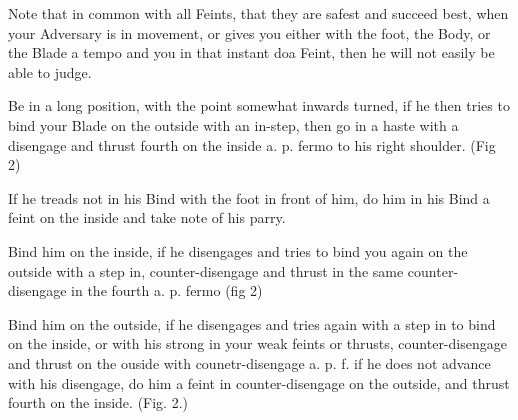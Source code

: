\newpage


\newpage

\exercise{}
Note that in common with all Feints, that they are safest and succeed
best, when your Adversary is in movement, or gives you either with the
foot, the Body, or the Blade a tempo and you in that instant doa
Feint, then he will not easily be able to judge.

Be in a long position, with the point somewhat inwards turned, if he
then tries to bind your Blade on the outside with an in-step, then go
in a haste with a disengage and thrust fourth on the inside
a. p. fermo to his right shoulder. (Fig 2)

\exercise{}
If he treads not in his Bind with the foot in front of him, do him in
his Bind a feint on the inside and take note of his parry.

\exercise{}
Bind him on the inside, if he disengages and tries to bind you again on the outside with a step in, counter-disengage and thrust in the same counter-disengage in the fourth a. p. fermo (fig 2)

\exercise{}
Bind him on the outside, if he disengages and tries again with a step
in to bind on the inside, or with his strong in your weak feints or
thrusts, counter-disengage and thrust on the ouside with
counetr-disengage a. p. f. if he does not advance with his disengage,
do him a feint in counter-disengage on the outside, and thrust fourth
on the inside. (Fig. 2.)
